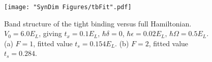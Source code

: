 \begin{figure}
	\texttt{[image: "SynDim Figures/tbFit".pdf]}
\caption{Band structure of the tight binding versus full Hamiltonian. $V_0=6.0 E_L$, giving $t_x=0.1 E_L$, $\hbar\delta=0$, $\hbar\epsilon=0.02 E_L$, $\hbar\Omega=0.5 E_L$. (a) $F=1$, fitted value $t_s=0.154 E_L$. (b) $F=2$, fitted value $t_s=0.284$. }
\label{fig:tbFit}
\end{figure}
%
%
%
